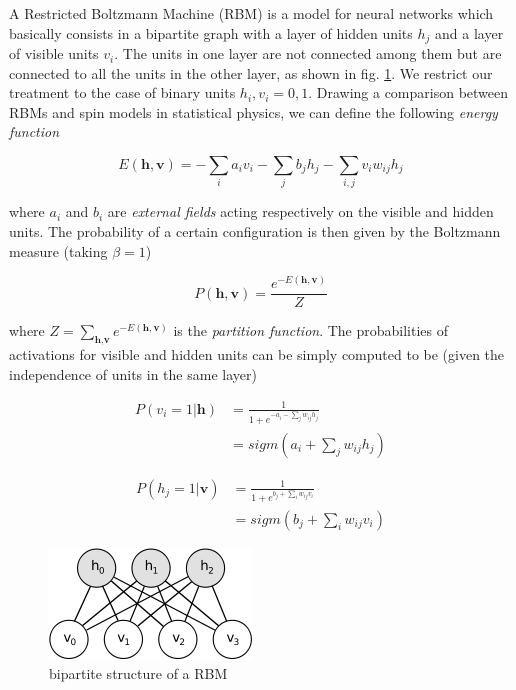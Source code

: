 \documentclass[notitlepage]{revtex4-1}
\begin{document}
A Restricted Boltzmann Machine (RBM) is a model for neural networks which basically consists in a bipartite graph with a layer of hidden units \(h_j\) and a layer of visible units \(v_i\). The units in one layer are not connected among them but are connected to all the units in the other layer, as shown in fig. \ref{fig:rbm}. We restrict our treatment to the case of binary units \(h_i,v_i = 0,1\). Drawing a comparison between RBMs and spin models in statistical physics, we can define the following \textit{energy function}

\begin{equation}
E(\textbf{h},\textbf{v}) = - \sum_i a_i v_i - \sum_j b_j h_j - \sum_{i,j} v_i w_{ij} h_j
\label{eq:ef}
\end{equation}

where \(a_i\) and \(b_i\) are \textit{external fields} acting respectively on the visible and hidden units. The probability of a certain configuration is then given by the Boltzmann measure (taking \(\beta = 1\))

\begin{equation}
P(\textbf{h},\textbf{v}) = \frac{e^{-E(\textbf{h},\textbf{v})}}{Z}
\end{equation}

where \( \textstyle Z = \sum_{\textbf{h},\textbf{v}} e^{-E(\textbf{h},\textbf{v})}\) is the \textit{partition function}. The probabilities of activations for visible and hidden units can be simply computed to be (given the independence of units in the same layer)

\begin{align}
P(v_i = 1 | \textbf{h}) &  = \frac{1}{1+e^{-a_i - \sum_{j} w_{ij} h_j}} \nonumber \\
& = sigm \left(a_i + \sum_{j} w_{ij} h_j \right)
\label{eq:act_vis}
\end{align}

\begin{align}
P(h_j = 1 | \textbf{v}) & = \frac{1}{1+e^{b_j + \sum_i w_{ij} v_i}} \nonumber \\
& = sigm \left(b_j + \sum_i w_{ij} v_i \right)
\label{eq:act_hid}
\end{align}

\begin{figure}
  \centering
  \includegraphics{rbm.png}
  \caption{bipartite structure of a RBM}
  \label{fig:rbm}
\end{figure}
\end{document}
